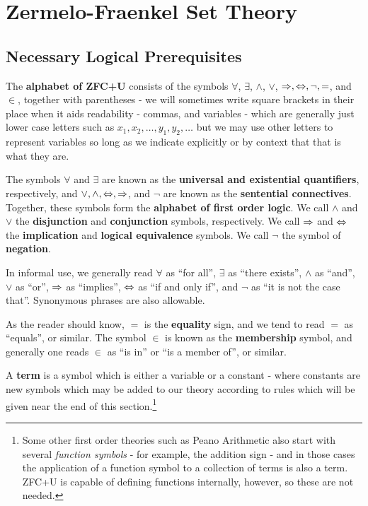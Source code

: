 \chapter{Zermelo-Fraenkel Set Theory}
\label{Chpt: Zermelo-Fraenkel Set Theory}

\section{Necessary Logical Prerequisites}
\label{- Sec: Necessary Logical Prerequisites}

\begin{defn}
\label{Defn: Alphabet of ZFC+U}
The \textbf{alphabet of ZFC+U} consists of the symbols $\forall$, $\exists$, $\land$, $\lor$, $\Rightarrow, \Leftrightarrow, \lnot, =$, and $\in$, together with parentheses - we will sometimes write square brackets in their place when it aids readability - commas, and variables - which are generally just lower case letters such as $x_1, x_2, \dots, y_1, y_2, \dots$ but we may use other letters to represent variables so long as we indicate explicitly or by context that that is what they are.

The symbols $\forall$ and $\exists$ are known as the \textbf{universal and existential quantifiers}, respectively, and $\lor, \land, \Leftrightarrow, \Rightarrow$, and $\lnot$ are known as the \textbf{sentential connectives}. Together, these symbols form the \textbf{alphabet of first order logic}. We call $\land$ and $\lor$ the \textbf{disjunction} and \textbf{conjunction} symbols, respectively. We call $\Rightarrow$ and $\Leftrightarrow$ the \textbf{implication} and \textbf{logical equivalence} symbols. We call $\lnot$ the symbol of \textbf{negation}. 

In informal use, we generally read $\forall$ as \enquote{for all}, $\exists$ as \enquote{there exists}, $\land$ as \enquote{and}, $\lor$ as \enquote{or}, $\Rightarrow$ as \enquote{implies}, $\Leftrightarrow$ as \enquote{if and only if}, and $\lnot$ as \enquote{it is not the case that}. Synonymous phrases are also allowable.

As the reader should know, $=$ is the \textbf{equality} sign, and we tend to read $=$ as \enquote{equals}, or similar. The symbol $\in$ is known as the \textbf{membership} symbol, and generally one reads $\in$ as \enquote{is in} or \enquote{is a member of}, or similar. 
\end{defn}

\begin{defn}
\label{Defn: Term}
A \textbf{term} is a symbol which is either a variable or a constant - where constants are new symbols which may be added to our theory according to rules which will be given near the end of this section.\footnote{Some other first order theories such as Peano Arithmetic also start with several \emph{function symbols} - for example, the addition sign - and in those cases the application of a function symbol to a collection of terms is also a term. ZFC+U is capable of defining functions internally, however, so these are not needed.}
\end{defn}


